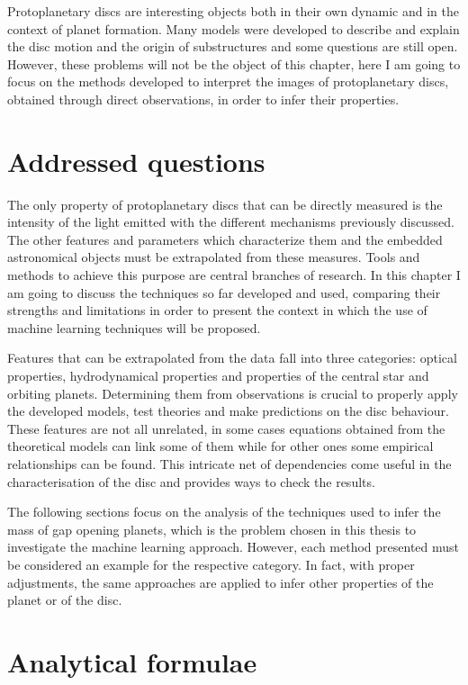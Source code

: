 \documentclass[a4paper,10pt]{report}
\begin{document}
Protoplanetary discs are interesting objects both in their own dynamic and
in the context of planet formation.
Many models were developed to describe and explain the disc motion and the origin of substructures and
some questions are still open. However, these problems will not be the object of this chapter, 
here I am going to focus on the methods developed to interpret the
images of protoplanetary discs, obtained through direct observations, in order to infer their properties.

\section{Addressed questions}


The only property of protoplanetary discs that can be directly measured
is the intensity of the light emitted with the different mechanisms previously discussed.
The other features and parameters which characterize them and the embedded astronomical objects
must be extrapolated from these measures. 
Tools and methods to achieve this purpose are central branches of research. In this chapter I am going to discuss
the techniques so far developed and used, comparing their strengths and limitations in order to present the context
in which the use of machine learning techniques will be proposed.


Features that can be extrapolated from the data fall into three categories: optical properties, hydrodynamical properties
and properties of the central star and orbiting planets.
Determining them from observations is crucial
to properly apply the developed models, test theories and make predictions on the disc behaviour.
These features are not all unrelated, in some cases equations obtained from the theoretical
models can link some of them while for other ones some empirical relationships can be found.
This intricate net of dependencies come useful in the characterisation of the disc and provides 
ways to check the results.

The following sections focus on the analysis of the
techniques used to infer the mass of gap opening planets, which is
the problem chosen in this thesis to investigate the machine learning approach.
However, each method presented must be considered an example for the respective category. 
In fact, with proper adjustments, the same approaches are
applied to infer other properties of the planet or of the disc.

\section{Analytical formulae}
\end{document}
